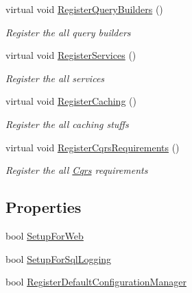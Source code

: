 \begin{DoxyCompactItemize}
virtual void \hyperlink{classCqrs_1_1Ninject_1_1Configuration_1_1CqrsModule_afc0f6417f69d5424fe7bba7a6724970f_afc0f6417f69d5424fe7bba7a6724970f}{Register\+Query\+Builders} ()
\begin{DoxyCompactList}\small\item\em Register the all query builders \end{DoxyCompactList}\item 
virtual void \hyperlink{classCqrs_1_1Ninject_1_1Configuration_1_1CqrsModule_ac6f0db82440e24190a5692d352fb4524_ac6f0db82440e24190a5692d352fb4524}{Register\+Services} ()
\begin{DoxyCompactList}\small\item\em Register the all services \end{DoxyCompactList}\item 
virtual void \hyperlink{classCqrs_1_1Ninject_1_1Configuration_1_1CqrsModule_a6ca61a712ab7efc28eb38e7f74853e3e_a6ca61a712ab7efc28eb38e7f74853e3e}{Register\+Caching} ()
\begin{DoxyCompactList}\small\item\em Register the all caching stuffs \end{DoxyCompactList}\item 
virtual void \hyperlink{classCqrs_1_1Ninject_1_1Configuration_1_1CqrsModule_a61a20168f5dc9dab74bb2f7fad7c0adb_a61a20168f5dc9dab74bb2f7fad7c0adb}{Register\+Cqrs\+Requirements} ()
\begin{DoxyCompactList}\small\item\em Register the all \hyperlink{namespaceCqrs}{Cqrs} requirements \end{DoxyCompactList}\end{DoxyCompactItemize}
\subsection*{Properties}
\begin{DoxyCompactItemize}
\item 
bool \hyperlink{classCqrs_1_1Ninject_1_1Configuration_1_1CqrsModule_ae4bbc2d44f283644a328d308dc78edc5_ae4bbc2d44f283644a328d308dc78edc5}{Setup\+For\+Web}
\item 
bool \hyperlink{classCqrs_1_1Ninject_1_1Configuration_1_1CqrsModule_a10e7a8adbe03fc05ebb7003727cbe541_a10e7a8adbe03fc05ebb7003727cbe541}{Setup\+For\+Sql\+Logging}
\item 
bool \hyperlink{classCqrs_1_1Ninject_1_1Configuration_1_1CqrsModule_a7e5a1cbb5bcfda3bcc06dc24a38995e2_a7e5a1cbb5bcfda3bcc06dc24a38995e2}{Register\+Default\+Configuration\+Manager}
\end{DoxyCompactItemize}
